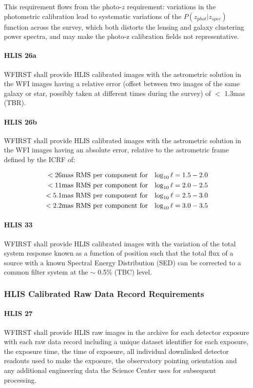 This requirement flows from the photo-$z$ requirement: variations in the
photometric calibration lead to systematic variations of the $P(z_{phot}|z_{spec})$
function across the survey, which both distorts the lensing and galaxy
clustering power spectra, and may make the photo-z calibration fields not
representative.

\paragraph{HLIS 26a} WFIRST shall provide HLIS calibrated images with the astrometric
solution in the WFI images having a relative error (offset between two images of
the same galaxy or star, possibly taken at different times during the survey) of $<$
1.3mas (TBR).

\paragraph{HLIS 26b} WFIRST shall provide HLIS calibrated images with the astrometric
solution in the WFI images having an absolute error, relative to the astrometric
frame defined by the ICRF of:

\begin{eqnarray}
<26  & \rm{mas\ RMS\ per\ component\ for} & \log_{10}\ell = 1.5 - 2.0\\
<11  & \rm{mas\ RMS\ per\ component\ for} & \log_{10}\ell = 2.0 - 2.5\\
<5.1 & \rm{mas\ RMS\ per\ component\ for} & \log_{10}\ell = 2.5 - 3.0\\
<2.2 & \rm{mas\ RMS\ per\ component\ for} & \log_{10}\ell = 3.0 - 3.5
\end{eqnarray}

\paragraph{HLIS 33} WFIRST shall provide HLIS calibrated images with the
variation of the total system response known as a function of position such that
the total flux of a source with a known Spectral Energy Distribution (SED) can
be corrected to a common filter system at the $\sim$ 0.5\% (TBC) level.

\subsubsection{HLIS Calibrated Raw Data Record Requirements}

\paragraph{HLIS 27} WFIRST shall provide HLIS raw images in the archive for each
detector exposure with each raw data record including a unique dataset
identifier for each exposure, the exposure time, the time of exposure, all
individual downlinked detector readouts used to make the exposure, the
observatory pointing orientation and any additional engineering data the Science
Center uses for subsequent processing.


